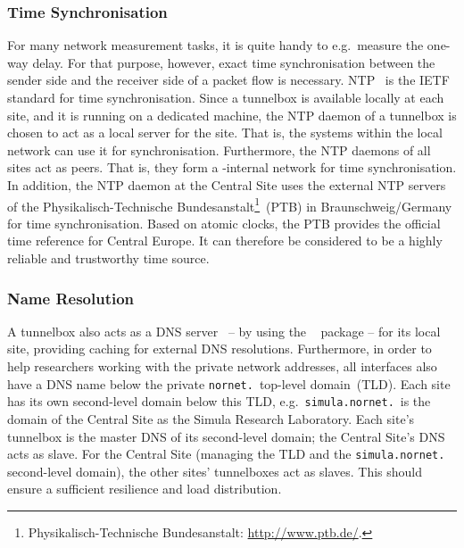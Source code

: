 \subsubsection{Time Synchronisation}

For many network measurement tasks, it is quite handy to e.g.\ measure the one-way delay. For that purpose, however, exact time synchronisation between the sender side and the receiver side of a packet flow is necessary. NTP~\cite{RFC5905} is the IETF standard for time synchronisation. Since a tunnelbox is available locally at each site, and it is running on a dedicated machine, the NTP daemon of a tunnelbox is chosen to act as a local server for the site. That is, the systems within the local network can use it for synchronisation. Furthermore, the NTP daemons of all sites act as peers. That is, they form a -internal network for time synchronisation. In addition, the NTP daemon at the Central Site uses the external NTP servers of the Physikalisch-Technische Bundesanstalt\footnote{Physikalisch-Technische Bundesanstalt: \url{http://www.ptb.de/}.}~(PTB) in Braunschweig/Germany for time synchronisation. Based on atomic clocks, the PTB provides the official time reference for Central Europe. It can therefore be considered to be a highly reliable and trustworthy time source.

\subsubsection{Name Resolution}

A tunnelbox also acts as a DNS server~\cite{RFC1035} -- by using the ~\cite{Bind9ARM} package -- for its local site, providing caching for external DNS resolutions. Furthermore, in order to help researchers working with the  private network addresses, all interfaces also have a DNS name below the private \texttt{nornet.}\ top-level domain~(TLD). Each site has its own second-level domain below this TLD, e.g.\ \texttt{simula.nornet.}\ is the domain of the Central Site as the Simula Research Laboratory. Each site's tunnelbox is the master DNS of its second-level domain; the Central Site's DNS acts as slave. For the Central Site (managing the TLD and the \texttt{simula.nornet.} second-level domain), the other sites' tunnelboxes act as slaves. This should ensure a sufficient resilience and load distribution.

